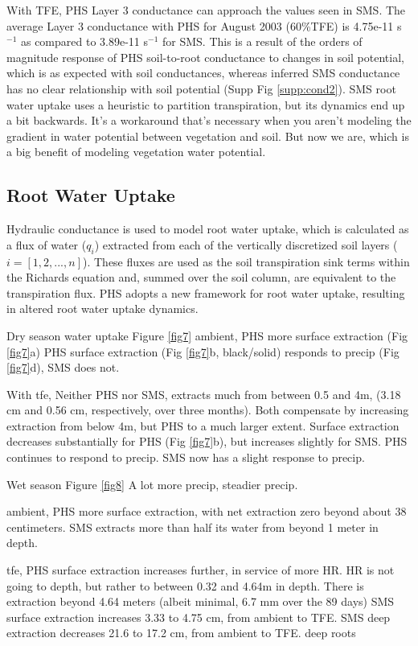 \documentclass[draft,linenumbers]{agujournal}
\begin{document}
With TFE, PHS Layer 3 conductance can approach the values seen in SMS. 
The average Layer 3 conductance with PHS for August 2003 (60\%TFE) is 4.75e-11 s$^{-1}$ as compared to 3.89e-11 s$^{-1}$ for SMS.
This is a result of the orders of magnitude response of PHS soil-to-root conductance to changes in soil potential, which is as expected with soil conductances,
whereas inferred SMS conductance has no clear relationship with soil potential (Supp Fig \ref{supp:cond2}). 
SMS root water uptake uses a heuristic to partition transpiration, but its dynamics end up a bit backwards. 
It's a workaround that's necessary when you aren't modeling the gradient in water potential between vegetation and soil. 
But now we are, which is a big benefit of modeling vegetation water potential.

\subsection{Root Water Uptake}

Hydraulic conductance is used to model root water uptake, which is calculated as a flux of water ($q_i$) extracted from each of the vertically discretized soil layers ($i=\left[1,2,...,n\right]$).
These fluxes are used as the soil transpiration sink terms within the Richards equation and, summed over the soil column, are equivalent to the transpiration flux.
PHS adopts a new framework for root water uptake, resulting in altered root water uptake dynamics.

Dry season water uptake Figure \ref{fig7} 
ambient, 
PHS more surface extraction (Fig \ref{fig7}a)
PHS surface extraction (Fig \ref{fig7}b, black/solid) responds to precip (Fig \ref{fig7}d),
SMS does not.

With tfe,
Neither PHS nor SMS, extracts much from between 0.5 and 4m, (3.18 cm and 0.56 cm, respectively, over three months).
Both compensate by increasing extraction from below 4m, but PHS to a much larger extent.
Surface extraction decreases substantially for PHS (Fig \ref{fig7}b),
but increases slightly for SMS.
PHS continues to respond to precip.
SMS now has a slight response to precip.

Wet season Figure \ref{fig8}
A lot more precip, steadier precip.

ambient,
PHS more surface extraction, with net extraction zero beyond about 38 centimeters.
SMS extracts more than half its water from beyond 1 meter in depth.

tfe,
PHS surface extraction increases further, in service of more HR.
HR is not going to depth, but rather to between 0.32 and 4.64m in depth.
There is extraction beyond 4.64 meters (albeit minimal, 6.7 mm over the 89 days)
SMS surface extraction increases 3.33 to 4.75 cm, from ambient to TFE.
SMS deep extraction decreases 21.6 to 17.2 cm, from ambient to TFE.
deep roots \citep{nepstad1994}
\end{document}
